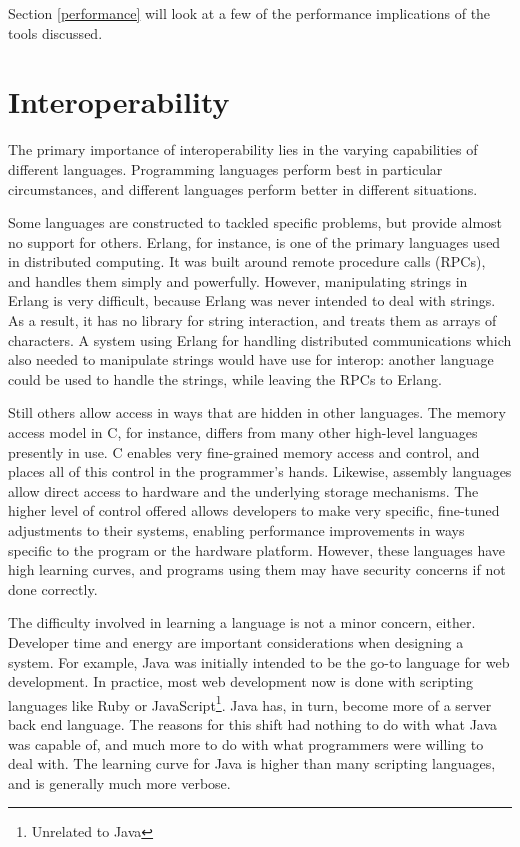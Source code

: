 \documentclass{sig-alternate}
\begin{document}
Section \ref{performance} will look at a few of the performance implications of the tools discussed.


\section{Interoperability}\label{Interop}
The primary importance of interoperability lies in the varying capabilities of different languages. Programming languages perform best in particular circumstances, and different languages perform better in different situations.

Some languages are constructed to tackled specific problems, but provide almost no support for others. Erlang, for instance, is one of the primary languages used in distributed computing. It was built around remote procedure calls (RPCs), and handles them simply and powerfully. However, manipulating strings in Erlang is very difficult, because Erlang was never intended to deal with strings. As a result, it has no library for string interaction, and treats them as arrays of characters. A system using Erlang for handling distributed communications which also needed to manipulate strings would have use for interop: another language could be used to handle the strings, while leaving the RPCs to Erlang.

Still others allow access in ways that are hidden in other languages. The memory access model in C, for instance, differs from many other high-level languages presently in use. C enables very fine-grained memory access and control, and places all of this control in the programmer's hands. Likewise, assembly languages allow direct access to hardware and the underlying storage mechanisms. The higher level of control offered allows developers to make very specific, fine-tuned adjustments to their systems, enabling performance improvements in ways specific to the program or the hardware platform. However, these languages have high learning curves, and programs using them may have security concerns if not done correctly.

The difficulty involved in learning a language is not a minor concern, either. Developer time and energy are important considerations when designing a system.
For example, Java was initially intended to be the go-to language for web development. In practice, most web development now is done with scripting languages like Ruby or JavaScript\footnote{Unrelated to Java}. Java has, in turn, become more of a server back end language. The reasons for this shift had nothing to do with what Java was capable of, and much more to do with what programmers were willing to deal with.
The learning curve for Java is higher than many scripting languages, and is generally much more verbose.
\end{document}
